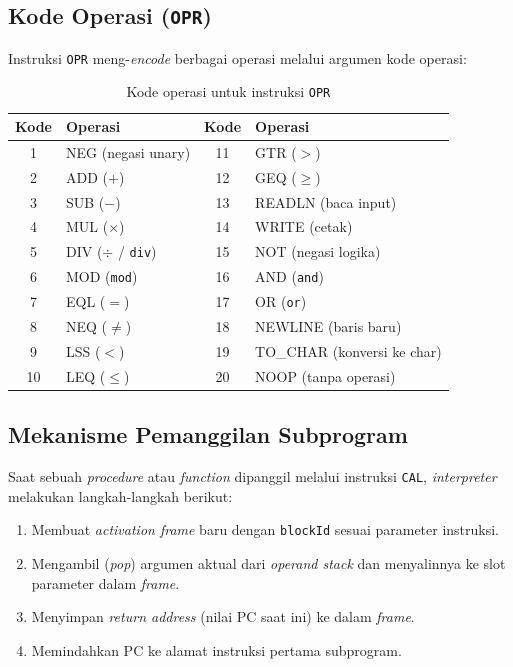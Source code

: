 \documentclass[12pt, a4paper]{article}
\begin{document}
\subsection{Kode Operasi (\texttt{OPR})}
Instruksi \texttt{OPR} meng-\textit{encode} berbagai operasi melalui argumen kode operasi:

\begin{table}[H]
    \centering
    \renewcommand{\arraystretch}{1.2}
    \begin{tabular}{|c|l||c|l|}
        \hline
        \textbf{Kode} & \textbf{Operasi} & \textbf{Kode} & \textbf{Operasi} \\
        \hline
        1 & NEG (negasi unary)     & 11 & GTR ($>$)         \\
        2 & ADD ($+$)               & 12 & GEQ ($\geq$)      \\
        3 & SUB ($-$)               & 13 & READLN (baca input) \\
        4 & MUL ($\times$)          & 14 & WRITE (cetak)       \\
        5 & DIV ($\div$ / \texttt{div}) & 15 & NOT (negasi logika) \\
        6 & MOD (\texttt{mod})       & 16 & AND (\texttt{and})  \\
        7 & EQL ($=$)               & 17 & OR (\texttt{or})    \\
        8 & NEQ ($\neq$)            & 18 & NEWLINE (baris baru) \\
        9 & LSS ($<$)               & 19 & TO\_CHAR (konversi ke char) \\
        10 & LEQ ($\leq$)           & 20 & NOOP (tanpa operasi) \\
        \hline
    \end{tabular}
    \caption{Kode operasi untuk instruksi \texttt{OPR}}
\end{table}

\subsection{Mekanisme Pemanggilan Subprogram}
Saat sebuah \textit{procedure} atau \textit{function} dipanggil melalui instruksi \texttt{CAL}, \textit{interpreter} melakukan langkah-langkah berikut:
\begin{enumerate}
    \item Membuat \textit{activation frame} baru dengan \texttt{blockId} sesuai parameter instruksi.
    \item Mengambil (\textit{pop}) argumen aktual dari \textit{operand stack} dan menyalinnya ke slot parameter dalam \textit{frame}.
    \item Menyimpan \textit{return address} (nilai PC saat ini) ke dalam \textit{frame}.
    \item Memindahkan PC ke alamat instruksi pertama subprogram.
\end{enumerate}
\end{document}

